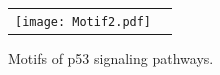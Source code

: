 \documentclass[a4paper]{article}
\begin{document}
\begin{figure}[h!]
\centering
\begin{tabular}{cc}
\texttt{[image: Motif2.pdf]}\\
\end{tabular}
\caption{Motifs of p53 signaling pathways.}
\label{fig:motifs}
\end{figure}








\newpage

\end{document}

